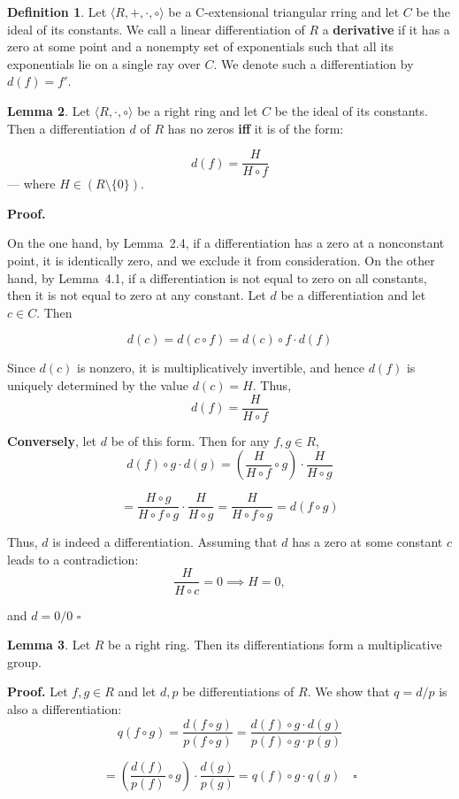 \documentclass[12pt]{article}
\theoremstyle{definition}
\newtheorem{definition}{Definition}[section]
\newtheorem{lemma}[definition]{Lemma}
\begin{document}
\vspace{10pt}
\begin{definition} Let $\langle R, +, \cdot, \circ \rangle$ be a C-extensional triangular rring and let \(C\) be 
    the ideal of its constants. We call a linear differentiation of \(R\) a \textbf{derivative} if it has a zero 
    at some point and a nonempty set of exponentials such that all its exponentials lie on a single ray over \(C\).
    We denote such a differentiation by \(d(f) = f'\).
\end{definition}



\begin{lemma}
Let \(\langle R, \cdot, \circ \rangle\) be a right ring and let \(C\) be the ideal of its constants. 
Then a differentiation \(d\) of \(R\) has no zeros \textbf{iff} it is of the form:

\[
d(f) = \frac{H}{H \circ f}
\]
--- where \(H \in (R \setminus \{0\})\). 

\vspace{10pt}
\textbf{Proof.} 

On the one hand, by Lemma~2.4, if a differentiation has a zero at a nonconstant point, 
it is identically zero, and we exclude it from consideration. On the other hand, by Lemma~4.1, 
if a differentiation is not equal to zero on all constants, then it is not equal to zero at any constant. 
Let \(d\) be a differentiation and let \(c \in C\). Then

\[
d(c) = d(c \circ f) = d(c) \circ f \cdot d(f)
\]

Since \(d(c)\) is nonzero, it is multiplicatively invertible, and hence \(d(f)\) is uniquely determined 
by the value \(d(c) = H\). Thus,
\[
d(f) = \frac{H}{H \circ f}
\]

\textbf{Conversely}, let \(d\) be of this form. Then for any \(f, g \in R\),
\[
d(f) \circ g \cdot d(g) = \left( \frac{H}{H \circ f} \circ g \right) \cdot \frac{H}{H \circ g} 
\]

\[
= \frac{H \circ g}{H \circ f \circ g} \cdot \frac{H}{H \circ g} = \frac{H}{H \circ f \circ g} = d(f \circ g)
\]

Thus, \(d\) is indeed a differentiation. Assuming that \(d\) has a zero at some constant \(c\) leads to a contradiction:
\[
\frac{H}{H \circ c} = 0 \implies H = 0,
\]

and \(d = 0/0\) $\square$
\end{lemma}

\begin{lemma}
Let \(R\) be a right ring. Then its differentiations form a multiplicative group.

\vspace{10pt}
\textbf{Proof.} 
Let \(f, g \in R\) and let \(d, p\) be differentiations of \(R\). We show that \(q = d / p\) is also a differentiation:
\[
q(f \circ g) = \frac{d(f \circ g)}{p(f \circ g)} = \frac{d(f) \circ g \cdot d(g)}{p(f) \circ g \cdot p(g)} 
\]

\[
= \left( \frac{d(f)}{p(f)} \circ g \right) \cdot \frac{d(g)}{p(g)} = q(f) \circ g \cdot q(g) \quad \square
\]

\end{lemma}
\end{document}
